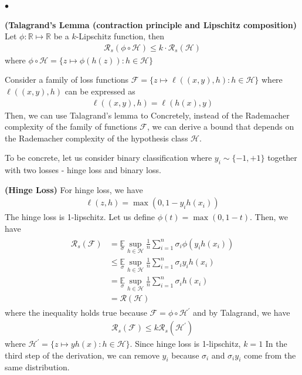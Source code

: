 \documentclass{article}
\newcommand{\bfs}[1]{\textbf{({#1}) }}
\begin{document}
$\bullet$ 

\begin{lema}\bfs{Talagrand's Lemma (contraction principle and Lipschitz composition}
 Let $\phi: \mathbb{R} \mapsto \mathbb{R}$ be a $k$-Lipschitz function, then
\begin{align*}
\mathcal{R}_{s}(\phi \circ \mathcal{H}) \leq k \cdot \mathcal{R}_{s}(\mathcal{H})
\end{align*}
where $\phi \circ \mathcal{H}=\{z \mapsto \phi(h(z)): h \in \mathcal{H}\}$
\end{lema}


Consider a family of loss functions $\mathcal{F}=\{z \mapsto \ell((x, y), h): h \in \mathcal{H}\}$ where $\ell((x, y), h)$ can be expressed as
\begin{align*}
\ell((x, y), h)=\ell(h(x), y)
\end{align*}
Then, we can use Talagrand's lemma to  Concretely, instead of the Rademacher complexity of the family of functions $\mathcal{F}$, we can derive a bound that depends on the Rademacher complexity of the hypothesis class $\mathcal{H}$. 

To be concrete, let us consider binary classification where $y_{i} \sim\{-1,+1\}$ together with two losses - hinge loss and binary loss.

\begin{exma}\bfs{Hinge Loss}
For hinge loss, we have
\begin{align*}
\ell(z, h)=\max \left(0,1-y_{i} h\left(x_{i}\right)\right)
\end{align*}
The hinge loss is 1-lipschitz. Let us define $\phi(t)=\max (0,1-t)$. Then, we have
\begin{align*}
\begin{aligned}
\mathcal{R}_{s}(\mathcal{F}) &=\underset{\sigma}{\mathbb{E}} \sup _{h \in \mathcal{H}} \frac{1}{n} \sum_{i=1}^{n} \sigma_{i} \phi\left(y_{i} h\left(x_{i}\right)\right) \\
& \leq \underset{\sigma}{\mathbb{E}} \sup _{h \in \mathcal{H}} \frac{1}{n} \sum_{i=1}^{n} \sigma_{i} y_{i} h\left(x_{i}\right) \\
&=\underset{\sigma}{\mathbb{E}} \sup _{h \in \mathcal{H}} \frac{1}{n} \sum_{i=1}^{n} \sigma_{i} h\left(x_{i}\right) \\
&=\mathcal{R}(\mathcal{H})
\end{aligned}
\end{align*}
where the inequality holds true because $\mathcal{F}=\phi \circ \mathcal{H}^{\prime}$ and by Talagrand, we have
\begin{align*}
\mathcal{R}_{s}(\mathcal{F}) \leq k \mathcal{R}_{s}\left(\mathcal{H}^{\prime}\right)
\end{align*}
where $\mathcal{H}^{\prime}=\{z \mapsto y h(x): h \in \mathcal{H}\} .$ Since hinge loss is 1-lipschitz, $k=1$
In the third step of the derivation, we can remove $y_{i}$ because $\sigma_{i}$ and $\sigma_{i} y_{i}$ come from the same distribution.
\end{exma} 
\end{document}

